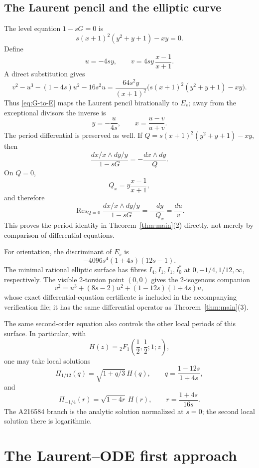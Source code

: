 \documentclass[11pt,fleqn]{article}
\theoremstyle{plain}
\begin{document}
\subsection*{The Laurent pencil and the elliptic curve}
The level equation \(1-sG=0\) is
\begin{equation}\label{eq:G-pencil}
 s(x+1)^2(y^2+y+1)-xy=0.
\end{equation}
Define
\begin{equation}\label{eq:G-to-E}
 u=-4sy,
 \qquad
 v=4sy\,\frac{x-1}{x+1}.
\end{equation}
A direct substitution gives
\[
 v^2-u^3-(1-4s)u^2-16s^2u
 =\frac{64s^2y}{(x+1)^2}
 \bigl(s(x+1)^2(y^2+y+1)-xy\bigr).
\]
Thus \eqref{eq:G-to-E} maps the Laurent pencil birationally to $E_s$;
away from the exceptional divisors the inverse is
\begin{equation}\label{eq:E-to-G}
 y=-\frac{u}{4s},
 \qquad
 x=\frac{u-v}{u+v}.
\end{equation}
The period differential is preserved as well.  If
\(Q=s(x+1)^2(y^2+y+1)-xy\), then
\[
 \frac{dx/x\wedge dy/y}{1-sG}=-\frac{dx\wedge dy}{Q}.
\]
On \(Q=0\),
\[
 Q_x=y\frac{x-1}{x+1},
\]
and therefore
\begin{equation}\label{eq:residue-map}
 \operatorname{Res}_{Q=0}\frac{dx/x\wedge dy/y}{1-sG}
 =-\frac{dy}{Q_x}
 =\frac{du}{v}.
\end{equation}
This proves the period identity in Theorem~\ref{thm:main}(2) directly, not merely
by comparison of differential equations.

For orientation, the discriminant of $E_s$ is
\[
 -4096s^4(1+4s)(12s-1).
\]
The minimal rational elliptic surface has fibres
\(I_4,I_1,I_1,I_0^*\) at \(0,-1/4,1/12,\infty\), respectively.  The visible
2-torsion point \((0,0)\) gives the 2-isogenous companion
\[
 v^2=u^3+(8s-2)u^2+(1-12s)(1+4s)u,
\]
whose exact differential-equation certificate is included in the accompanying
verification file; it has the same differential operator as Theorem~\ref{thm:main}(3).

The same second-order equation also controls the other local periods of this
surface.  In particular, with
\[
 H(z)={}_2F_1\!\left(\frac12,\frac12;1;z\right),
\]
one may take local solutions
\[
 \Pi_{1/12}(q)=\sqrt{1+q/3}\,H(q),
 \qquad q=\frac{1-12s}{1+4s},
\]
and
\[
 \Pi_{-1/4}(r)=\sqrt{1-4r}\,H(r),
 \qquad r=\frac{1+4s}{16s}.
\]
The A216584 branch is the analytic solution normalized at \(s=0\); the
second local solution there is logarithmic.

\section{The Laurent--ODE first approach}
\end{document}
